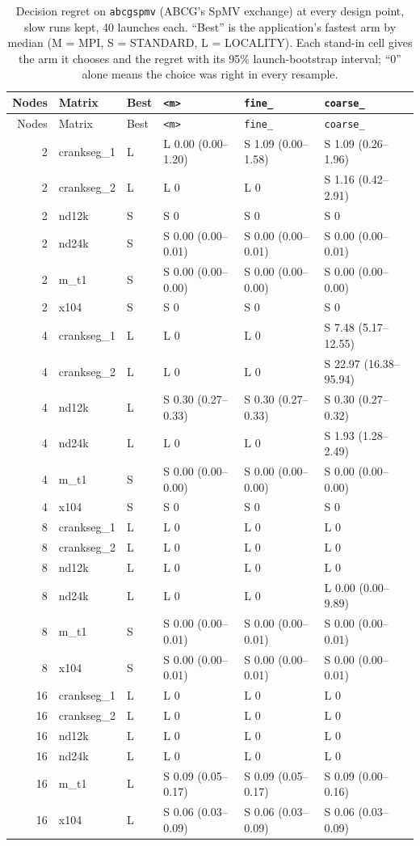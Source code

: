 \documentclass[11pt]{article}
\newcommand{\kM}{\texttt{<m>}}
\newcommand{\kF}{\texttt{fine\_}}
\newcommand{\kC}{\texttt{coarse\_}}
\newcommand{\spmv}{\texttt{abcgspmv}}
\begin{document}
\small
\begin{longtable}{@{}rllp{2.9cm}p{2.9cm}p{2.9cm}@{}}
\caption{Decision regret on \spmv{} (ABCG's SpMV exchange) at every design point, slow runs kept, 40 launches
each. ``Best'' is the application's fastest arm by median (M = MPI, S = STANDARD, L =
LOCALITY). Each stand-in cell gives the arm it chooses and the regret with its 95\%
launch-bootstrap interval; ``0'' alone means the choice was right in every resample.}
\label{tab:app:h17abcgspmv}\\
\toprule
Nodes & Matrix & Best & \kM & \kF & \kC \\
\midrule
\endfirsthead
\toprule
Nodes & Matrix & Best & \kM & \kF & \kC \\
\midrule
\endhead
2 & crankseg\_1 & L & L 0.00 (0.00--1.20) & S 1.09 (0.00--1.58) & S 1.09 (0.26--1.96) \\
2 & crankseg\_2 & L & L 0 & L 0 & S 1.16 (0.42--2.91) \\
2 & nd12k & S & S 0 & S 0 & S 0 \\
2 & nd24k & S & S 0.00 (0.00--0.01) & S 0.00 (0.00--0.01) & S 0.00 (0.00--0.01) \\
2 & m\_t1 & S & S 0.00 (0.00--0.00) & S 0.00 (0.00--0.00) & S 0.00 (0.00--0.00) \\
2 & x104 & S & S 0 & S 0 & S 0 \\
\midrule
4 & crankseg\_1 & L & L 0 & L 0 & S 7.48 (5.17--12.55) \\
4 & crankseg\_2 & L & L 0 & L 0 & S 22.97 (16.38--95.94) \\
4 & nd12k & L & S 0.30 (0.27--0.33) & S 0.30 (0.27--0.33) & S 0.30 (0.27--0.32) \\
4 & nd24k & L & L 0 & L 0 & S 1.93 (1.28--2.49) \\
4 & m\_t1 & S & S 0.00 (0.00--0.00) & S 0.00 (0.00--0.00) & S 0.00 (0.00--0.00) \\
4 & x104 & S & S 0 & S 0 & S 0 \\
\midrule
8 & crankseg\_1 & L & L 0 & L 0 & L 0 \\
8 & crankseg\_2 & L & L 0 & L 0 & L 0 \\
8 & nd12k & L & L 0 & L 0 & L 0 \\
8 & nd24k & L & L 0 & L 0 & L 0.00 (0.00--9.89) \\
8 & m\_t1 & S & S 0.00 (0.00--0.01) & S 0.00 (0.00--0.01) & S 0.00 (0.00--0.01) \\
8 & x104 & S & S 0.00 (0.00--0.01) & S 0.00 (0.00--0.01) & S 0.00 (0.00--0.01) \\
\midrule
16 & crankseg\_1 & L & L 0 & L 0 & L 0 \\
16 & crankseg\_2 & L & L 0 & L 0 & L 0 \\
16 & nd12k & L & L 0 & L 0 & L 0 \\
16 & nd24k & L & L 0 & L 0 & L 0 \\
16 & m\_t1 & L & S 0.09 (0.05--0.17) & S 0.09 (0.05--0.17) & S 0.09 (0.00--0.16) \\
16 & x104 & L & S 0.06 (0.03--0.09) & S 0.06 (0.03--0.09) & S 0.06 (0.03--0.09) \\

\bottomrule
\end{longtable}
\normalsize
\end{document}
